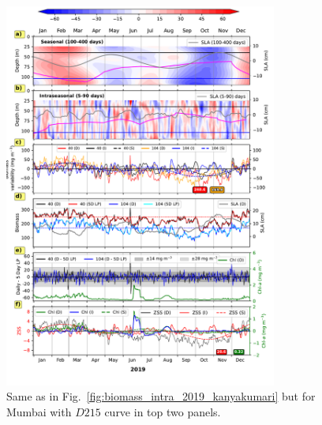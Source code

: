 \documentclass[12pt,a4paper]{article}
\begin{document}
\begin{figure}[htbp]
	\centering
	\includegraphics[width=0.8\textwidth]{./fig_s08_biomass_intra_2019_mumbai.pdf} 
	\caption{Same as in Fig.~\ref{fig:biomass_intra_2019_kanyakumari} but for Mumbai with $D215$ curve in top two panels.}		
	\label{fig:biomass_intra_2019_mumbai}
\end{figure}
\end{document}
